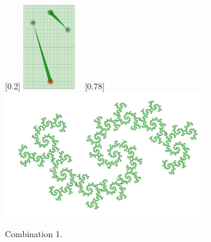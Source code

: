            \begin{figure}[H]
                \centering
                \caption{\label{ray_04} Combination 1.}
                [0.2\textwidth]
                    {\includegraphics[width=0.2\textwidth]{img/Simple_Techniques/Cases/rays/ray_set_04.png}}
                ~
                [0.78\textwidth]
                    {\includegraphics[width=0.78\textwidth]{img/Simple_Techniques/Cases/rays/ray_04.png}}
            \end{figure}

